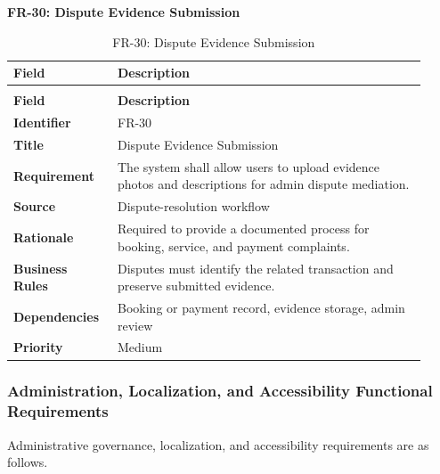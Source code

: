 \documentclass[12pt,a4paper]{article}
\begin{document}
\noindent\textbf{FR-30: Dispute Evidence Submission}\par
\vspace{4pt}
\begingroup\small\setlength{\tabcolsep}{4pt}\renewcommand{\arraystretch}{1.15}
\begin{longtable}{|>{\raggedright\arraybackslash}p{0.22\linewidth}|>{\raggedright\arraybackslash}p{0.70\linewidth}|}
\caption{FR-30: Dispute Evidence Submission}\label{tab:fr-30}\\
\hline
\textbf{Field} & \textbf{Description} \\ \hline
\endfirsthead
\multicolumn{2}{c}{Table \thetable\ Dispute Evidence Submission (continued)}\\
\hline
\textbf{Field} & \textbf{Description} \\ \hline
\endhead
\textbf{Identifier} & FR-30 \\ \hline
\textbf{Title} & Dispute Evidence Submission \\ \hline
\textbf{Requirement} & The system shall allow users to upload evidence photos and descriptions for admin dispute mediation. \\ \hline
\textbf{Source} & Dispute-resolution workflow \\ \hline
\textbf{Rationale} & Required to provide a documented process for booking, service, and payment complaints. \\ \hline
\textbf{Business Rules} & Disputes must identify the related transaction and preserve submitted evidence. \\ \hline
\textbf{Dependencies} & Booking or payment record, evidence storage, admin review \\ \hline
\textbf{Priority} & Medium \\ \hline
\end{longtable}
\endgroup
\clearpage

\subsubsection{Administration, Localization, and Accessibility Functional Requirements}
Administrative governance, localization, and accessibility requirements are as follows.
\end{document}
